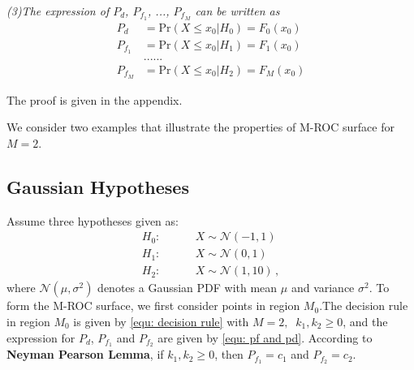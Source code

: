 \documentclass[12pt,journal,a4paper,twoside,onecolumn]{IEEEtran}
\begin{document}
\begin{spacing}{2.5}
\textit{(3)The expression of $P_d$, $P_{f_1}$, ..., $P_{f_M}$ can be written as}
\begin{equation}
\label{equ: chi pd}
  \begin{split}
    P_d &= \text{Pr}(X \leq x_0 | H_0) = F_0(x_0)\\
        P_{f_1} &= \text{Pr}(X \leq x_0 | H_1) = F_1(x_0)\\
        &......\\
            P_{f_M} &= \text{Pr}(X \leq x_0 | H_2) = F_M(x_0)
  \end{split}
\end{equation}

The proof is given in the appendix.

We consider two examples that illustrate the properties of M-ROC surface for $M = 2$.

\subsection{Gaussian Hypotheses}
Assume three hypotheses given as:
\begin{equation}
\label{equ: Gaussian Hypothesis}
\begin{split}
	H_0:\;\;\;\;\;\;\;\;&X \sim \mathcal{N}(-1,1)\\
    H_1:\;\;\;\;\;\;\;\;&X \sim \mathcal{N}(0,1)\\
    H_2:\;\;\;\;\;\;\;\;&X \sim \mathcal{N}(1,10)\,,
\end{split}
\end{equation}
where $\mathcal{N}(\mu,\sigma^2)$ denotes a Gaussian PDF with mean $\mu$ and variance $\sigma^2$.
To form the M-ROC surface, we first consider points in region $M_0$.The decision rule in region $M_0$ is given by \eqref{equ: decision rule}
with $M=2,\;\;k_1, k_2 \geq 0$, and the expression for $P_d$, $P_{f_1}$ and $P_{f_2}$ are given by \eqref{equ: pf and pd}. According to \textbf{Neyman Pearson Lemma}, if $k_1, k_2 \geq 0$, then $P_{f_1} = c_1$ and $P_{f_2} = c_2$.


\end{spacing}
\end{document}
